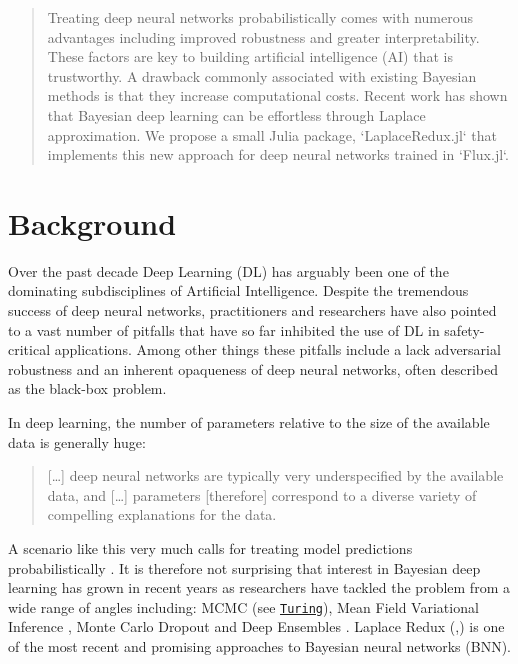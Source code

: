 \documentclass{juliacon}
\begin{document}


\maketitle

\begin{abstract}

Treating deep neural networks probabilistically comes with numerous advantages including improved robustness and greater interpretability. These factors are key to building artificial intelligence (AI) that is trustworthy. A drawback commonly associated with existing Bayesian methods is that they increase computational costs. Recent work has shown that Bayesian deep learning can be effortless through Laplace approximation. We propose a small Julia package, `LaplaceRedux.jl` that implements this new approach for deep neural networks trained in `Flux.jl`.

\end{abstract}

\hypertarget{sec-intro}{%
\section{Background}\label{sec-intro}}

Over the past decade Deep Learning (DL) has arguably been one of the
dominating subdisciplines of Artificial Intelligence. Despite the
tremendous success of deep neural networks, practitioners and
researchers have also pointed to a vast number of pitfalls that have so
far inhibited the use of DL in safety-critical applications. Among other
things these pitfalls include a lack adversarial robustness
\cite{goodfellow2014explaining} and an inherent opaqueness of deep
neural networks, often described as the black-box problem.

In deep learning, the number of parameters relative to the size of the
available data is generally huge:

\begin{quote}
{[}\ldots{]} deep neural networks are typically very underspecified by
the available data, and {[}\ldots{]} parameters {[}therefore{]}
correspond to a diverse variety of compelling explanations for the data.
\cite{wilson2020case}
\end{quote}

A scenario like this very much calls for treating model predictions
probabilistically \cite{wilson2020case}. It is therefore not surprising
that interest in Bayesian deep learning has grown in recent years as
researchers have tackled the problem from a wide range of angles
including: MCMC (see
\href{https://turing.ml/dev/tutorials/03-bayesian-neural-network/}{\texttt{Turing}}),
Mean Field Variational Inference \cite{blundell2015weight}, Monte Carlo
Dropout \cite{gal2016dropout} and Deep Ensembles
\cite{lakshminarayanan2016simple}. Laplace Redux
(\cite{immer2020improving},\cite{daxberger2021laplace}) is one of the
most recent and promising approaches to Bayesian neural networks (BNN).
\end{document}
